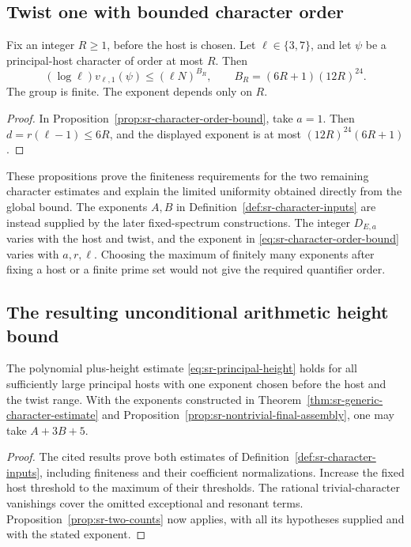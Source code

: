 \subsection{Twist one with bounded character order}
\label{sec:sr-bounded-order-one}
\begin{srproposition}\label{prop:sr-bounded-order-one}
Fix an integer \(R\geq1\), before the host is chosen.
Let \(\ell\in\{3,7\}\), and let \(\psi\) be a principal-host
character of order at most \(R\). Then
\[
 (\log\ell)v_{\ell,1}(\psi)
       \leq(\ell N)^{B_R},\qquad
                  B_R=(6R+1)(12R)^{24}.
\]
The group is finite. The exponent depends only on \(R\).
\end{srproposition}
\begin{proof}
In Proposition~\ref{prop:sr-character-order-bound}, take \(a=1\).
Then \(d=r(\ell-1)\leq6R\), and the displayed exponent is at most
\((12R)^{24}(6R+1)\).
\end{proof}

These propositions prove the finiteness requirements for the two
remaining character estimates and explain the limited uniformity
obtained directly from the global bound.
The exponents \(A,B\) in Definition~\ref{def:sr-character-inputs}
are instead supplied by the later fixed-spectrum constructions.
The integer \(D_{E,a}\) varies with the host and twist, and the
exponent in \eqref{eq:sr-character-order-bound} varies with
\(a,r,\ell\).
Choosing the maximum of finitely many exponents after fixing a
host or a finite prime set would not give the required quantifier
order.


\subsection{The resulting unconditional arithmetic height bound}
\begin{srcorollary}\label{cor:sr-principal-plus-height-proved}
The polynomial plus-height estimate
\eqref{eq:sr-principal-height} holds for all sufficiently large
principal hosts with one exponent chosen before the host and
the twist range. With the exponents constructed in
Theorem~\ref{thm:sr-generic-character-estimate} and
Proposition~\ref{prop:sr-nontrivial-final-assembly}, one may take
\(A+3B+5\).
\end{srcorollary}
\begin{proof}
The cited results prove both estimates of
Definition~\ref{def:sr-character-inputs}, including finiteness
and their coefficient normalizations. Increase the fixed host
threshold to the maximum of their thresholds.
The rational trivial-character vanishings cover the omitted
exceptional and resonant terms.
Proposition~\ref{prop:sr-two-counts} now applies, with all its
hypotheses supplied and with the stated exponent.
\end{proof}

